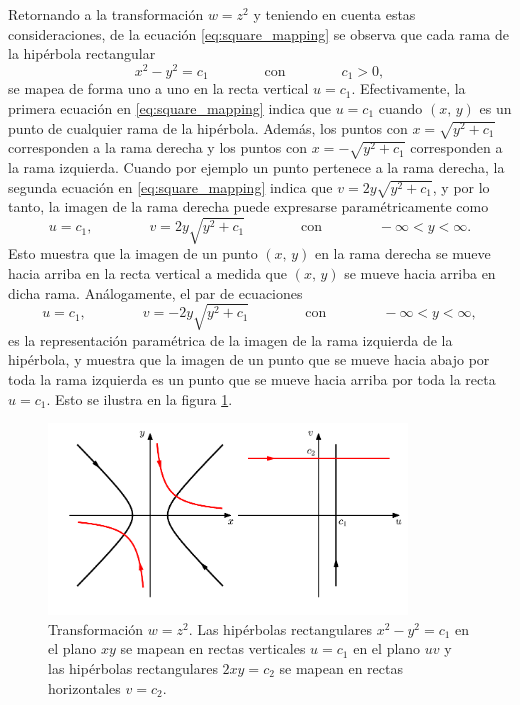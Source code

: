 \documentclass[a4paper]{report}
\begin{document}
Retornando a la transformación \(w=z^2\) y teniendo en cuenta estas consideraciones, de la ecuación \ref{eq:square_mapping} se observa que cada rama de la hipérbola rectangular
\begin{equation}\label{eq:rectangular_hyperbola_horizontal}
 x^2-y^2=c_1\qquad\qquad\textrm{con}\qquad\qquad c_1>0,
\end{equation}
se mapea de forma uno a uno en la recta vertical \(u=c_1\). Efectivamente, la primera ecuación en \ref{eq:square_mapping} indica que \(u=c_1\) cuando \((x,\,y)\) es un punto de cualquier rama de la hipérbola. Además, los puntos con \(x=\sqrt{y^2+c_1}\) corresponden a la rama derecha y los puntos con \(x=-\sqrt{y^2+c_1}\) corresponden a la rama izquierda. Cuando por ejemplo un punto pertenece a la rama derecha, la segunda ecuación en \ref{eq:square_mapping} indica que \(v=2y\sqrt{y^2+c_1}\), y por lo tanto, la imagen de la rama derecha puede expresarse paramétricamente como
\[
 u=c_1,\qquad\qquad v=2y\sqrt{y^2+c_1}\qquad\qquad\textrm{con}\qquad\qquad-\infty<y<\infty.
\]
Esto muestra que la imagen de un punto \((x,\,y)\) en la rama derecha se mueve hacia arriba en la recta vertical a medida que \((x,\,y)\) se mueve hacia arriba en dicha rama. Análogamente, el par de ecuaciones
\[
 u=c_1,\qquad\qquad v=-2y\sqrt{y^2+c_1}\qquad\qquad\textrm{con}\qquad\qquad-\infty<y<\infty,
\]
es la representación paramétrica de la imagen de la rama izquierda de la hipérbola, y muestra que la imagen de un punto que se mueve hacia abajo por toda la rama izquierda es un punto que se mueve hacia arriba por toda la recta \(u=c_1\). Esto se ilustra en la figura \ref{fig:square_mapping_hyperbola}.
\begin{figure}[!htb]
 \begin{center}
 \includegraphics[width=0.85\textwidth]{figuras/square_mapping_hyperbola.pdf}
 \caption{\label{fig:square_mapping_hyperbola} Transformación \(w=z^2\). Las hipérbolas rectangulares \(x^2-y^2=c_1\) en el plano \(xy\) se mapean en rectas verticales \(u=c_1\) en el plano \(uv\) y las hipérbolas rectangulares \(2xy=c_2\) se mapean en rectas horizontales \(v=c_2\).}
 \end{center}
\end{figure}
\end{document}
